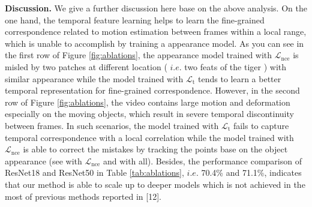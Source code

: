 \documentclass{article}
\begin{document}
\textbf{Discussion.} 
We give a further discussion here base on the above analysis. On the one hand, the temporal feature learning helps to learn the fine-grained correspondence related to motion estimation between frames within a local range, which is unable to accomplish by training a appearance model. As you can see in the first row of Figure \ref{fig:ablations}, the appearance model trained with $\mathcal{L}_{\mathrm{nce}}$ is misled by two patches at different location ( $i.e.$ two feats of the tiger ) with similar appearance while the model trained with $\mathcal{L}_{\mathrm{t}}$ tends to learn a better temporal representation for fine-grained correspondence. However, in the second row of Figure \ref{fig:ablations}, the video contains large motion and deformation especially on the moving objects, which result in severe temporal discontinuity between frames. In such scenarios, the model trained with $\mathcal{L}_{\mathrm{t}}$ fails to capture temporal correspondence with a local correlation while the model trained with $\mathcal{L}_{\mathrm{nce}}$ is able to correct the mistakes by tracking the points base on the object appearance (see with $\mathcal{L}_{\mathrm{nce}}$ and with all).
 Besides, the performance comparison of ResNet18 and ResNet50 in Table \ref{tab:ablations}, $i.e.$ 70.4\% and 71.1\%, indicates that our method is able to scale up to deeper models which is not achieved in the most of previous methods reported in [12].
\end{document}
